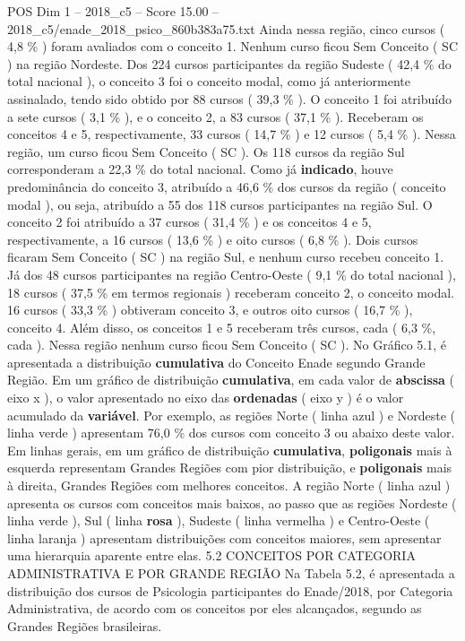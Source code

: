 \begin{textsample}{POS Dim 1 – 2018\_c5 – Score 15.00 – 2018\_c5/enade\_2018\_psico\_860b383a75.txt}
Ainda nessa região, cinco cursos ( 4,8 \% ) foram avaliados com o conceito 1.
Nenhum curso ficou Sem Conceito ( SC ) na região Nordeste.
Dos 224 cursos participantes da região Sudeste ( 42,4 \% do total nacional ), o conceito 3 foi o conceito modal, como já anteriormente assinalado, tendo sido obtido por 88 cursos ( 39,3 \% ).
O conceito 1 foi atribuído a sete cursos ( 3,1 \% ), e o conceito 2, a 83 cursos ( 37,1 \% ).
Receberam os conceitos 4 e 5, respectivamente, 33 cursos ( 14,7 \% ) e 12 cursos ( 5,4 \% ).
Nessa região, um curso ficou Sem Conceito ( SC ).
Os 118 cursos da região Sul corresponderam a 22,3 \% do total nacional.
Como já \textbf{indicado}, houve predominância do conceito 3, atribuído a 46,6 \% dos cursos da região ( conceito modal ), ou seja, atribuído a 55 dos 118 cursos participantes na região Sul.
O conceito 2 foi atribuído a 37 cursos ( 31,4 \% ) e os conceitos 4 e 5, respectivamente, a 16 cursos ( 13,6 \% ) e oito cursos ( 6,8 \% ).
Dois cursos ficaram Sem Conceito ( SC ) na região Sul, e nenhum curso recebeu conceito 1.
Já dos 48 cursos participantes na região Centro-Oeste ( 9,1 \% do total nacional ), 18 cursos ( 37,5 \% em termos regionais ) receberam conceito 2, o conceito modal. 16 cursos ( 33,3 \% ) obtiveram conceito 3, e outros oito cursos ( 16,7 \% ), conceito 4.
Além disso, os conceitos 1 e 5 receberam três cursos, cada ( 6,3 \%, cada ).
Nessa região nenhum curso ficou Sem Conceito ( SC ).
No Gráfico 5.1, é apresentada a distribuição \textbf{cumulativa} do Conceito Enade segundo Grande Região.
Em um gráfico de distribuição \textbf{cumulativa}, em cada valor de \textbf{abscissa} ( eixo x ), o valor apresentado no eixo das \textbf{ordenadas} ( eixo y ) é o valor acumulado da \textbf{variável}.
Por exemplo, as regiões Norte ( linha azul ) e Nordeste ( linha verde ) apresentam 76,0 \% dos cursos com conceito 3 ou abaixo deste valor.
Em linhas gerais, em um gráfico de distribuição \textbf{cumulativa}, \textbf{poligonais} mais à esquerda representam Grandes Regiões com pior distribuição, e \textbf{poligonais} mais à direita, Grandes Regiões com melhores conceitos.
A região Norte ( linha azul ) apresenta os cursos com conceitos mais baixos, ao passo que as regiões Nordeste ( linha verde ), Sul ( linha \textbf{rosa} ), Sudeste ( linha vermelha ) e Centro-Oeste ( linha laranja ) apresentam distribuições com conceitos maiores, sem apresentar uma hierarquia aparente entre elas. 5.2 CONCEITOS POR CATEGORIA ADMINISTRATIVA E POR GRANDE REGIÃO Na Tabela 5.2, é apresentada a distribuição dos cursos de Psicologia participantes do Enade/2018, por Categoria Administrativa, de acordo com os conceitos por eles alcançados, segundo as Grandes Regiões brasileiras.

\end{textsample}
